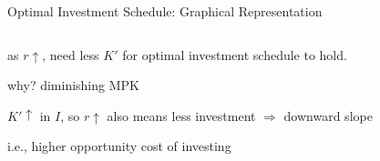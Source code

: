 \documentclass[11pt,aspectratio=169,usenames,dvipsnames]{beamer}
\let\tempone\itemize
\let\temptwo\enditemize
\renewenvironment{itemize}{\tempone\addtolength{\itemsep}{\fill}}{\temptwo}
\begin{document}
\begin{frame}{Optimal Investment Schedule: Graphical Representation}
\begin{columns}
\begin{column}{0.4\textwidth}
             \begin{itemize}
                 \item as $ r \uparrow  $, need less $ K' $ for optimal investment schedule to hold.
                 \begin{itemize}
                     \item why? diminishing MPK
                 \end{itemize}
                 \item $ K' \uparrow  $ in $ I $, so $ r \uparrow  $ also means less investment $ \Rightarrow  $ \alert{downward slope}
                 \item i.e., higher opportunity cost of investing
             \end{itemize}
         \end{column}
     \end{columns}
\end{frame}
\end{document}
